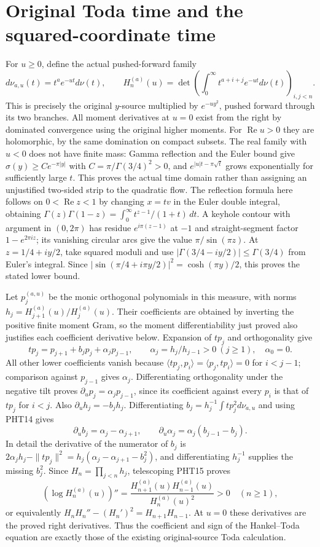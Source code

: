 \documentclass[11pt,a4paper]{article}
\begin{document}
\section{Original Toda time and the squared-coordinate time}

For $u\geq0$, define the actual pushed-forward family
\[
 d\nu_{a,u}(t)=t^a e^{-ut}d\nu(t),\qquad
 H_n^{(a)}(u)=\det\left(\int_0^\infty
                    t^{a+i+j}e^{-ut}d\nu(t)\right)_{i,j<n}.
\tag{PHT13}
\]
This is precisely the original $y$-source multiplied by
$e^{-u y^2}$, pushed forward through its two branches.
All moment derivatives at $u=0$ exist from the right by
dominated convergence using the original higher moments.
For $\operatorname{Re}u>0$ they are holomorphic, by the same
domination on compact subsets. The real family with $u<0$
does not have finite mass: Gamma reflection and the Euler
bound give $\sigma(y)\geq C e^{-\pi|y|}$ with
$C=\pi/\Gamma(3/4)^2>0$, and
$e^{|u|t-\pi\sqrt t}$ grows exponentially for sufficiently
large $t$. This proves the actual time domain rather than
assigning an unjustified two-sided strip to the quadratic flow.
The reflection formula here follows on $0<\operatorname{Re}z<1$
by changing $x=tv$ in the Euler double integral, obtaining
$\Gamma(z)\Gamma(1-z)=\int_0^\infty t^{z-1}/(1+t)\,dt$.
A keyhole contour with argument in $(0,2\pi)$ has residue
$e^{i\pi(z-1)}$ at $-1$ and straight-segment factor
$1-e^{2\pi iz}$; its vanishing circular arcs give the value
$\pi/\sin(\pi z)$. At $z=1/4+iy/2$, take squared moduli
and use $|\Gamma(3/4-iy/2)|\leq\Gamma(3/4)$ from Euler's
integral. Since $|\sin(\pi/4+i\pi y/2)|^2
=\cosh(\pi y)/2$, this proves the stated lower bound.

Let $p_j^{(a,u)}$ be the monic orthogonal polynomials in this
measure, with norms $h_j=H_{j+1}^{(a)}(u)/H_j^{(a)}(u)$.
Their coefficients are obtained by inverting the positive
finite moment Gram, so the moment differentiability just
proved also justifies each coefficient derivative below.
Expansion of $tp_j$ and orthogonality give
\[
 tp_j=p_{j+1}+b_jp_j+\alpha_jp_{j-1},\qquad
 \alpha_j=h_j/h_{j-1}>0\ (j\geq1),\quad\alpha_0=0.
\tag{PHT14}
\]
All other lower coefficients vanish because
$\langle tp_j,p_i\rangle=\langle p_j,tp_i\rangle=0$
for $i<j-1$; comparison against $p_{j-1}$ gives $\alpha_j$.
Differentiating orthogonality under the negative tilt proves
$\partial_u p_j=\alpha_jp_{j-1}$, since its coefficient
against every $p_i$ is that of $tp_j$ for $i<j$.
Also $\partial_u h_j=-b_jh_j$. Differentiating
$b_j=h_j^{-1}\int t p_j^2d\nu_{a,u}$ and using PHT14 gives
\[
 \partial_u b_j=\alpha_j-\alpha_{j+1},\qquad
 \partial_u\alpha_j=\alpha_j(b_{j-1}-b_j).
\tag{PHT15}
\]
In detail the derivative of the numerator of $b_j$ is
$2\alpha_jh_j-\|tp_j\|^2
=h_j(\alpha_j-\alpha_{j+1}-b_j^2)$, and differentiating
$h_j^{-1}$ supplies the missing $b_j^2$.
Since $H_n=\prod_{j<n}h_j$, telescoping PHT15 proves
\[
 (\log H_n^{(a)}(u))''
  =\frac{H_{n+1}^{(a)}(u)H_{n-1}^{(a)}(u)}{H_n^{(a)}(u)^2}>0
  \quad(n\geq1),
\tag{PHT16}
\]
or equivalently
$H_nH_n''-(H_n')^2=H_{n+1}H_{n-1}$.
At $u=0$ these derivatives are the proved right derivatives.
Thus the coefficient and sign of the Hankel--Toda equation
are exactly those of the existing original-source Toda calculation.
\end{document}

